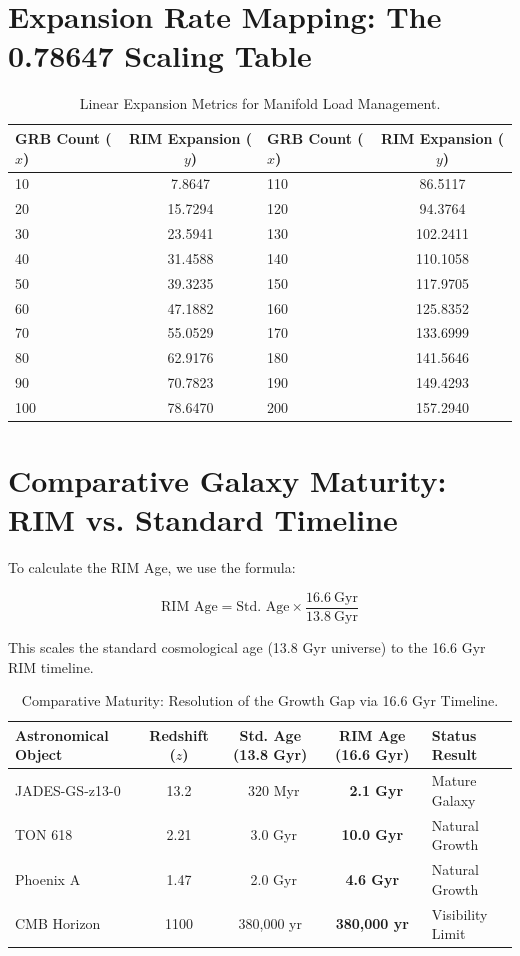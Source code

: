 \documentclass[12pt]{article}
\begin{document}
\section{Expansion Rate Mapping: The 0.78647 Scaling Table}
\begin{table}[h!]
\centering
\small
\begin{tabularx}{0.8\textwidth}{@{}X c X c@{}}
\toprule
GRB Count ($x$) & RIM Expansion ($y$) & GRB Count ($x$) & RIM Expansion ($y$) \\
\midrule
10  & 7.8647   & 110 & 86.5117  \\
20  & 15.7294  & 120 & 94.3764  \\
30  & 23.5941  & 130 & 102.2411 \\
40  & 31.4588  & 140 & 110.1058  \\
50  & 39.3235  & 150 & 117.9705  \\
60  & 47.1882  & 160 & 125.8352  \\
70  & 55.0529  & 170 & 133.6999  \\
80  & 62.9176  & 180 & 141.5646  \\
90  & 70.7823  & 190 & 149.4293  \\
100 & 78.6470  & 200 & 157.2940  \\
\bottomrule
\end{tabularx}
\caption{Linear Expansion Metrics for Manifold Load Management.}
\label{tab:lookup}
\end{table}

\section{Comparative Galaxy Maturity: RIM vs. Standard Timeline}

To calculate the RIM Age, we use the formula:

\begin{equation}
\text{RIM Age} = \text{Std. Age} \times \frac{16.6\ \text{Gyr}}{13.8\ \text{Gyr}}
\label{eq:rimage}
\end{equation}

This scales the standard cosmological age (13.8 Gyr universe) to the 16.6 Gyr RIM timeline.

\begin{table}[H]
\centering
\small
\begin{tabularx}{\textwidth}{@{}l c c c X@{}}
\toprule
Astronomical Object & Redshift ($z$) & Std. Age (13.8 Gyr) & \textbf{RIM Age (16.6 Gyr)} & Status Result \\
\midrule
JADES-GS-z13-0 & 13.2 & ~320 Myr & \textbf{~2.1 Gyr} & Mature Galaxy \\
TON 618 & 2.21 & ~3.0 Gyr & \textbf{10.0 Gyr} & Natural Growth \\
Phoenix A & 1.47 & ~2.0 Gyr & \textbf{4.6 Gyr} & Natural Growth \\
CMB Horizon & 1100 & 380,000 yr & \textbf{380,000 yr} & Visibility Limit \\
\bottomrule
\end{tabularx}
\caption{Comparative Maturity: Resolution of the Growth Gap via 16.6 Gyr Timeline.}
\label{tab:galaxymaturity}
\end{table}
\end{document}
